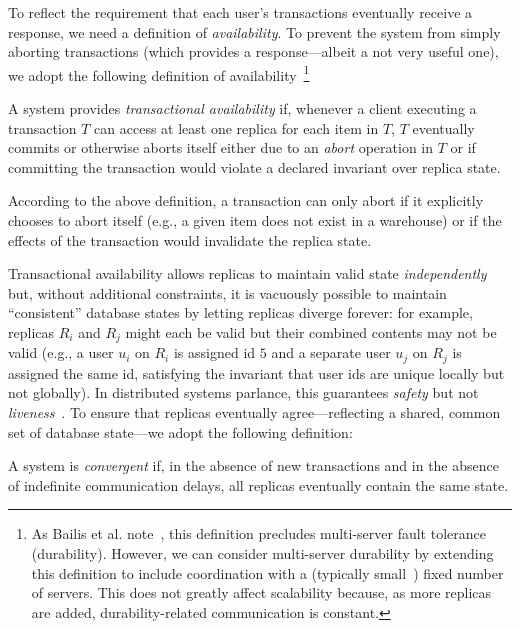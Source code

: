  To reflect the requirement
that each user's transactions eventually receive a response, we need a
definition of \textit{availability}. To prevent the system from simply
aborting transactions (which provides a response---albeit a not very
useful one), we adopt the following definition of
availability~\cite{hat-vldb}\footnote{As Bailis et
  al. note~\cite{hat-vldb}, this definition precludes multi-server
  fault tolerance (durability). However, we can consider multi-server
  durability by extending this definition to include coordination with
  a (typically small~\cite{bigtable,spanner,dynamo}) fixed number of
  servers. This does not greatly affect scalability because, as more
  replicas are added, durability-related communication is constant.}

\begin{definition} 
A system provides \textit{transactional availability} if, whenever a
client executing a transaction $T$ can access at least one replica for
each item in $T$, $T$ eventually commits or otherwise aborts itself
either due to an \textit{abort} operation in $T$ or if committing the
transaction would violate a declared invariant over replica state.
\end{definition}

According to the above definition, a transaction can only abort if it
explicitly chooses to abort itself (e.g., a given item does not exist
in a warehouse) or if the effects of the transaction would invalidate
the replica state.

 Transactional availability allows replicas to
maintain valid state \textit{independently} but, without additional
constraints, it is vacuously possible to maintain ``consistent''
database states by letting replicas diverge forever: for example,
replicas $R_i$ and $R_j$ might each be valid but their combined
contents may not be valid (e.g., a user $u_i$ on $R_i$ is assigned id
$5$ and a separate user $u_j$ on $R_j$ is assigned the same id,
satisfying the invariant that user ids are unique locally but not
globally). In distributed systems parlance, this guarantees
\textit{safety} but not \textit{liveness}~\cite{lamport-safety}. To
ensure that replicas eventually agree---reflecting a shared, common
set of database state---we adopt the following definition:

\begin{definition}A system is \textit{convergent} if, in the
absence of new transactions and in the absence of indefinite
communication delays, all replicas eventually contain the same state.
\end{definition}


